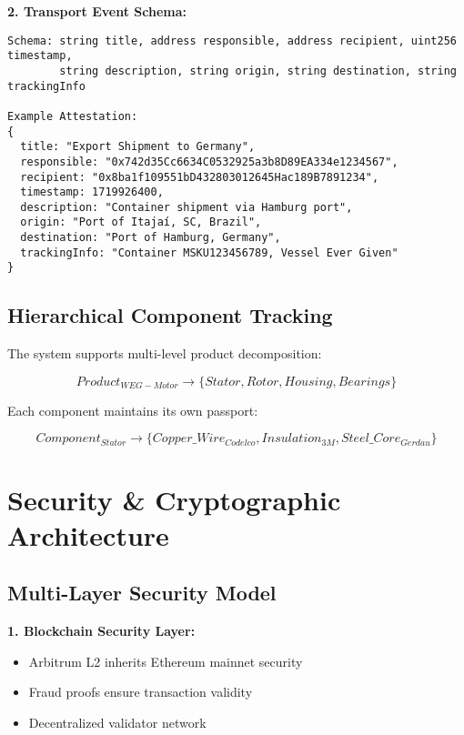 \documentclass[11pt,a4paper]{article}
\begin{document}
\textbf{2. Transport Event Schema:}
\begin{verbatim}
Schema: string title, address responsible, address recipient, uint256 timestamp,
        string description, string origin, string destination, string trackingInfo

Example Attestation:
{
  title: "Export Shipment to Germany",
  responsible: "0x742d35Cc6634C0532925a3b8D89EA334e1234567",
  recipient: "0x8ba1f109551bD432803012645Hac189B7891234",
  timestamp: 1719926400,
  description: "Container shipment via Hamburg port",
  origin: "Port of Itajaí, SC, Brazil",
  destination: "Port of Hamburg, Germany", 
  trackingInfo: "Container MSKU123456789, Vessel Ever Given"
}
\end{verbatim}

\subsection{Hierarchical Component Tracking}

The system supports multi-level product decomposition:

\begin{equation}
    Product_{WEG-Motor} \rightarrow \{Stator, Rotor, Housing, Bearings\}
\end{equation}

Each component maintains its own passport:

\begin{equation}
    Component_{Stator} \rightarrow \{Copper\_Wire_{Codelco}, Insulation_{3M}, Steel\_Core_{Gerdau}\}
\end{equation}

\section{Security \& Cryptographic Architecture}

\subsection{Multi-Layer Security Model}

\textbf{1. Blockchain Security Layer:}
\begin{itemize}[leftmargin=0.5cm]
    \item Arbitrum L2 inherits Ethereum mainnet security
    \item Fraud proofs ensure transaction validity
    \item Decentralized validator network
\end{itemize}
\end{document}
